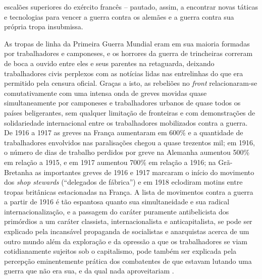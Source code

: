 escalões superiores do exército francês -- pautado, assim, a encontrar novas táticas e tecnologias para vencer a guerra contra os alemães e a guerra contra sua própria tropa insubmissa. 

As tropas de linha da Primeira Guerra Mundial eram em sua maioria formadas por trabalhadores e camponeses, e os horrores da guerra de trincheiras correram de boca a ouvido entre eles e seus parentes na retaguarda, deixando trabalhadores civis perplexos com as notícias lidas nas entrelinhas do que era permitido pela censura oficial. Graças a isto, as rebeliões no \textit{front} relacionaram-se comutativamente com uma intensa onda de greves movidas quase simultaneamente por camponeses e trabalhadores urbanos de quase todos os países beligerantes, sem qualquer limitação de fronteiras e com demonstrações de solidariedade internacional entre os trabalhadores mobilizados contra a guerra. De 1916 a 1917 as greves na França aumentaram em 600\% e a quantidade de trabalhadores envolvidos nas paralisações chegou a quase trezentos mil; em 1916, o número de dias de trabalho perdidos por greve na Alemanha aumentou 500\% em relação a 1915, e em 1917 aumentou 700\% em relação a 1916; na Grã-Bretanha as importantes greves de 1916 e 1917 marcaram o início do movimento dos \textit{shop stewards} (``delegados de fábrica'') e em 1918 eclodiram motins entre tropas britânicas estacionadas na França. A lista de movimentos contra a guerra a partir de 1916 é tão espantosa quanto sua simultaneidade e sua radical internacionalização, e a passagem do caráter puramente antibelicista dos primórdios a um caráter classista, internacionalista e anticapitalista, se pode ser explicado pela incansável propaganda de socialistas e anarquistas acerca de um outro mundo além da exploração e da opressão a que os trabalhadores se viam cotidianamente sujeitos sob o capitalismo, pode também ser explicada pela percepção eminentemente prática dos combatentes de que estavam lutando uma guerra que não era sua, e da qual nada aproveitariam \cite[p.~232-251]{bernardo_fascismo_2015}.

